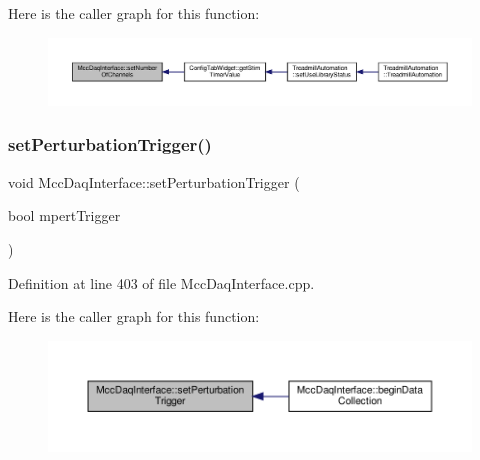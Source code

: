 Here is the caller graph for this function\+:
\nopagebreak
\begin{figure}[H]
\begin{center}
\leavevmode
\includegraphics[width=350pt]{class_mcc_daq_interface_a82ca01bbe3fcf58de7e4fdfc3d1aa379_icgraph}
\end{center}
\end{figure}
\mbox{\label{class_mcc_daq_interface_a02ca77cf28a12bafc03281c9b0792642}} 
\subsubsection{\texorpdfstring{set\+Perturbation\+Trigger()}{setPerturbationTrigger()}}
{\footnotesize\ttfamily void Mcc\+Daq\+Interface\+::set\+Perturbation\+Trigger (\begin{DoxyParamCaption}\item[{bool}]{mpert\+Trigger }\end{DoxyParamCaption})}



Definition at line 403 of file Mcc\+Daq\+Interface.\+cpp.

Here is the caller graph for this function\+:
\nopagebreak
\begin{figure}[H]
\begin{center}
\leavevmode
\includegraphics[width=350pt]{class_mcc_daq_interface_a02ca77cf28a12bafc03281c9b0792642_icgraph}
\end{center}
\end{figure}
\mbox{\label{class_mcc_daq_interface_ae489ccc434b8f12e01cce99f3acb97bc}} 
